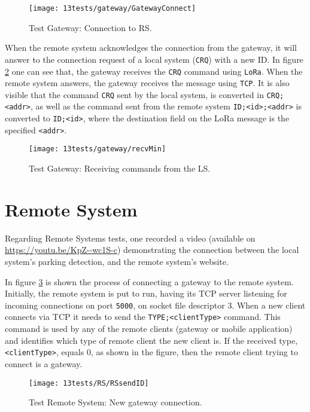 \begin{figure}[H]
	\centering	
	\texttt{[image: 13tests/gateway/GatewayConnect]}
	\caption{Test Gateway: Connection to RS.}
	\label{fig:}
\end{figure}

When the remote system acknowledges the connection from the gateway, it will answer to the connection request of a local system (\verb|CRQ|) with a new ID. In figure \ref{fig:recvMin} one can see that, the gateway receives the \verb|CRQ| command using \verb|LoRa|. When the remote system answers, the gateway receives the message using \verb|TCP|. It is also visible that the command \verb|CRQ| sent by the local system, is converted in \verb|CRQ;<addr>|, as well as the command sent from the remote system \verb|ID;<id>;<addr>| is converted to \verb|ID;<id>|, where the destination field on the LoRa message is the specified \verb|<addr>|.

\begin{figure}[H]
	\centering	
	\texttt{[image: 13tests/gateway/recvMin]}
	\caption{Test Gateway: Receiving commands from the LS.}
	\label{fig:recvMin}
\end{figure}

\clearpage
\section{Remote System}

Regarding Remote Systems tests, one recorded a video (available on \linebreak \url{https://youtu.be/KpZ--wc1S-c}) demonstrating the connection between the local system's parking detection, and the remote system's website.

In figure \ref{fig:rsnewgateway} is shown the process of connecting a gateway to the remote system. Initially, the remote system is put to run, having its TCP server listening for incoming connections on port \verb|5000|, on socket file descriptor 3. When a new client connects via TCP it needs to send the \verb|TYPE;<clientType>| command. This command is used by any of the remote clients (gateway or mobile application) and identifies which type of remote client the new client is. If the received type, \verb|<clientType>|, equals 0, as shown in the figure, then the remote client trying to connect is a gateway.

\begin{figure}[H]
	\centering	
	\texttt{[image: 13tests/RS/RSsendID]}
	\caption{Test Remote System: New gateway connection.}
	\label{fig:rsnewgateway}
\end{figure}


